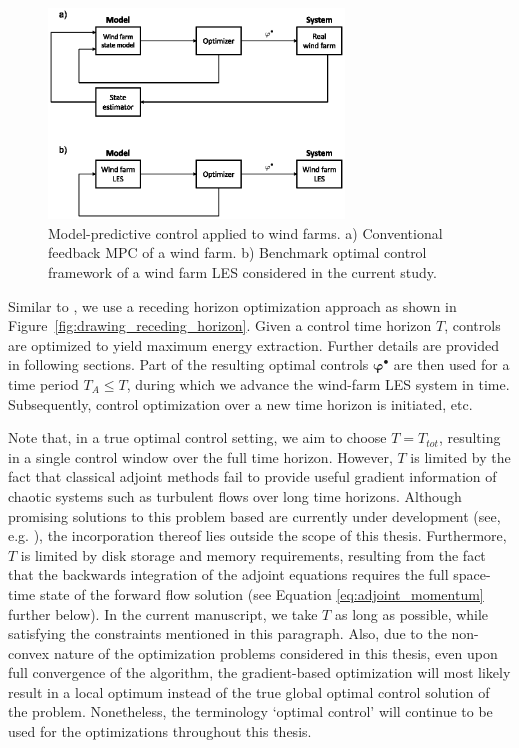 \begin{figure}
	\centering
	\includegraphics[width=0.7\textwidth]{chapters/optimal_control_problem/figure1.eps}
	\caption{Model-predictive control applied to wind farms. a) Conventional feedback MPC of a wind farm. b) Benchmark optimal control framework of a wind farm LES considered in the current study.}\label{fig:block_diag}
\end{figure}

Similar to \cite{goit2015optimal}, we use a receding horizon optimization approach as shown in Figure~\ref{fig:drawing_receding_horizon}. Given a control time horizon $T$, controls are optimized to yield maximum energy extraction. Further details are provided in following sections. Part of the resulting optimal controls $\boldsymbol{\varphi}^{\bullet}$ are then used for a time period $T_A \leq T$, during which we advance the wind-farm LES system in time. Subsequently, control optimization over a new time horizon is initiated, etc. 

Note that, in a true optimal control setting, we aim to choose $T = T_{tot}$, resulting in a single control window over the full time horizon. However, $T$ is limited by the fact that classical adjoint methods fail to provide useful gradient information of chaotic systems such as turbulent flows over long time horizons. Although promising solutions to this problem based are currently under development (see, e.g. \citealp{wang2014least, chater2016simplified}), the incorporation thereof lies outside the scope of this thesis. Furthermore, $T$ is limited by disk storage and memory requirements, resulting from the fact that the backwards integration of the adjoint equations requires the full space-time state of the forward flow solution (see Equation \ref{eq:adjoint_momentum} further below). In the current manuscript, we take $T$ as long as possible, while satisfying the constraints mentioned in this paragraph. Also, due to the non-convex nature of the optimization problems considered in this thesis, even upon full convergence of the algorithm, the gradient-based optimization will most likely result in a local optimum instead of the true global optimal control solution of the problem. Nonetheless, the terminology `optimal control' will continue to be used for the optimizations throughout this thesis. 

